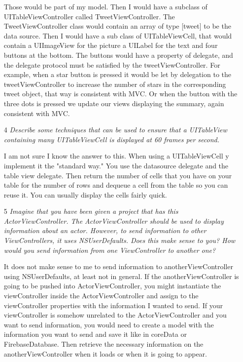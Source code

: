 \documentclass[12]{report}
\begin{document}
\begin{itemize}
Those would be part of my model. Then I would have a subclass of UITableViewController called TweetViewController.  The TweetViewController class would contain an array of type [tweet] to be the data source. Then I would have a sub class of UITableViewCell, that would contain a UIImageView for the picture a UILabel for the text and four buttons at the bottom. The buttons would have a property of delegate, and the delegate protocol must be satisfied by the tweetViewController.  For example, when a star button is pressed it would be let by delegation to the tweetViewController to increase the number of stars in the corresponding tweet object, that way is consistent with MVC.  Or when the button with the three dots is pressed we update our views displaying the summary, again consistent with MVC. 


\item[4] {\it Describe some techniques that can be used to ensure that a UITableView containing many UITableViewCell is displayed at 60 frames per second.}

I am not sure I know the answer to this. When using a UITableViewCell y implement it the "standard way." You use the datasource delegate and the table view delegate. Then return the number of cells that you have on your table for the number of rows and dequeue a cell from the table so you can reuse it. You can usually display the cells fairly quick. 

\item[5] {\it Imagine that you have been given a project that has this ActorViewController. The ActorViewController should be used to display information about an actor. However, to send information to other ViewControllers, it uses NSUserDefaults. Does this make sense to you? How would you send information from one ViewController to another one?}

It does not make sense to me to send information to anotherViewController using NSUserDefaults, at least not in general. If the anotherViewController is going to be pushed into ActorViewController, you might instantiate the viewController inside the ActorViewController and assign to the viewController properties with the information I wanted to send. If your viewController is somehow unrelated to the ActorViewController and you want to send information, you would need to create a model with the information you want to send and save it like in coreData or FirebaseDatabase. Then retrieve the necessary information on the anotherViewController when it loads or when it is going to appear.


\end{itemize}
\end{document}
